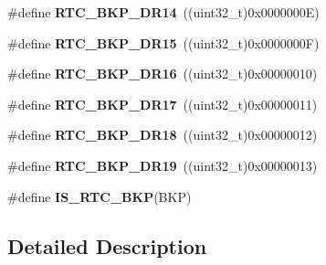 \begin{DoxyCompactItemize}
\item 
\hypertarget{group___r_t_c___backup___registers___definitions_ga718011f7c07a8a734fd51de0161fcddb}{\#define {\bfseries R\-T\-C\-\_\-\-B\-K\-P\-\_\-\-D\-R14}~((uint32\-\_\-t)0x0000000\-E)}\label{group___r_t_c___backup___registers___definitions_ga718011f7c07a8a734fd51de0161fcddb}

\item 
\hypertarget{group___r_t_c___backup___registers___definitions_ga01ad7db765e52ecd13f24bb09db27789}{\#define {\bfseries R\-T\-C\-\_\-\-B\-K\-P\-\_\-\-D\-R15}~((uint32\-\_\-t)0x0000000\-F)}\label{group___r_t_c___backup___registers___definitions_ga01ad7db765e52ecd13f24bb09db27789}

\item 
\hypertarget{group___r_t_c___backup___registers___definitions_ga767f5e169b56f4a2364deb705d322a7b}{\#define {\bfseries R\-T\-C\-\_\-\-B\-K\-P\-\_\-\-D\-R16}~((uint32\-\_\-t)0x00000010)}\label{group___r_t_c___backup___registers___definitions_ga767f5e169b56f4a2364deb705d322a7b}

\item 
\hypertarget{group___r_t_c___backup___registers___definitions_gabba03a6ab599f5f45db95244500177ff}{\#define {\bfseries R\-T\-C\-\_\-\-B\-K\-P\-\_\-\-D\-R17}~((uint32\-\_\-t)0x00000011)}\label{group___r_t_c___backup___registers___definitions_gabba03a6ab599f5f45db95244500177ff}

\item 
\hypertarget{group___r_t_c___backup___registers___definitions_ga9fc8a8a86892e0c517a56b2804b53006}{\#define {\bfseries R\-T\-C\-\_\-\-B\-K\-P\-\_\-\-D\-R18}~((uint32\-\_\-t)0x00000012)}\label{group___r_t_c___backup___registers___definitions_ga9fc8a8a86892e0c517a56b2804b53006}

\item 
\hypertarget{group___r_t_c___backup___registers___definitions_ga384af548d7386c490e6a65b2600c8c2b}{\#define {\bfseries R\-T\-C\-\_\-\-B\-K\-P\-\_\-\-D\-R19}~((uint32\-\_\-t)0x00000013)}\label{group___r_t_c___backup___registers___definitions_ga384af548d7386c490e6a65b2600c8c2b}

\item 
\#define {\bfseries I\-S\-\_\-\-R\-T\-C\-\_\-\-B\-K\-P}(B\-K\-P)
\end{DoxyCompactItemize}


\subsection{Detailed Description}


